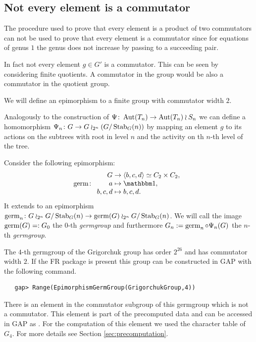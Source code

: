 \documentclass[a4paper,11pt]{amsart}
\begin{document}
\subsection{Not every element is a commutator}
The procedure used to prove that every element is a product of two commutators 
can not be used to prove that every element is a
commutator since for equations of genus $1$ the 
genus does not increase by passing to a succeeding pair. 

In fact not every element $g\in G'$ is a commutator. This can be seen by
considering finite quotients. A commutator in the group would be also a
commutator in the quotient group. 

We will define an epimorphism to a finite group with commutator width $2$.

Analogously to the construction of $\Psi\colon \operatorname{{Aut}}(T_n )\to \operatorname{{Aut}}(T_n) \wr S_n$
we can define a homomorphism $\Psi_n\colon G \to G\wr_{2^n}({G/\operatorname{Stab}_G(n)})$ by
mapping an element $g$ to its actions on the subtrees with root in level $n$
and the activity on th $n$-th level of the tree.

Consider the following epimorphism:
\begin{align*}
  \germ\colon\begin{array}{r@{\;}l}
               G&\to\left<b,c,d\right>\simeq C_2\times C_2, \\
               a&\mapsto\id,\\
               b,c,d&\mapsto b,c,d.
             \end{array}
\end{align*}
It extends to an epimorphism
$\operatorname{germ}_n\colon G\wr_{2^n} {G/\operatorname{Stab}_G(n)}\to \operatorname{germ}(G)\wr_{2^n}
{G/\operatorname{Stab}_G(n)}$.  We will call the image $\operatorname{germ}(G)=:G_0$ the
$0$-th \emph{germgroup} and furthermore
$G_n := \operatorname{germ}_n \circ \Psi_n(G)$ the $n$-th \emph{germgroup}.

The $4$-th germgroup of the Grigorchuk group has order $2^{26}$ and has commutator width $2$.
If the FR package is present this group can be constructed in GAP with 
the following command. 
\begin{lstlisting}
   gap> Range(EpimorphismGermGroup(GrigorchukGroup,4))
\end{lstlisting}
There is an element in the commutator subgroup of this germgroup which
is not a commutator. This element is part of the precomputed data and
can be accessed in GAP as . For the
computation of this element we used the character table of $G_4$. For more
details see Section \ref{sec:precomputation}.
\end{document}
